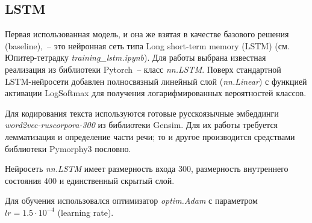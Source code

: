 \documentclass[a4paper,12pt]{article}
\begin{document}
\subsection{LSTM}

Первая использованная модель, и она же взятая в качестве базового решения (base\-line),~-- это нейронная сеть типа Long short-term memory (LSTM) (см. Юпитер-тетрадку \textit{training\_lstm.ipynb}). Для работы выбрана известная реализация из библиотеки Pytorch~-- класс \textit{nn.LSTM}. Поверх стандартной LSTM-нейросети добавлен полносвязный линейный слой (\textit{nn.Linear}) с функцией активации LogSoftmax для получения логарифмированных вероятностей классов.

Для кодирования текста используются готовые русскоязычные эмбеддинги \textit{word2vec-ruscorpora-300} из библиотеки Gensim. Для их работы требуется лемматизация и определение части речи; то и другое производится средствами библиотеки Pymorphy3 пословно.

Нейросеть \textit{nn.LSTM} имеет размерность входа $300$, размерность внутреннего состояния $400$ и единственный скрытый слой.

Для обучения использовался оптимизатор \textit{optim.Adam} с параметром $lr = 1.5 \cdot 10^{-4}$ (learning rate).
\end{document}
